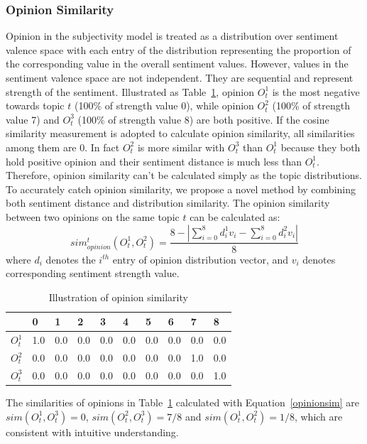 \documentclass[letterpaper]{article}
\begin{document}
\subsubsection{Opinion Similarity}
\label{opsim}

Opinion in the subjectivity model is treated  as a distribution over sentiment valence space with each entry of the distribution representing the proportion of the corresponding value in the overall sentiment values. 
However, values in the sentiment valence space are not independent. 
They are sequential and represent strength of the sentiment. Illustrated as Table~\ref{tab1}, opinion $ O_{t}^{1} $ is the most negative towards topic $ t $ (100\% of strength value 0), while opinion $ O_{t}^{2} $ (100\% of strength value 7) and $ O_{t}^{3} $ (100\% of strength value 8) are both positive.
If the cosine similarity measurement is adopted to calculate opinion similarity, all similarities among them are 0.
In fact $ O_{t}^{2} $ is more similar with $ O_{t}^{3} $ than $O_{t}^{1} $ because they both hold positive opinion and their sentiment distance is much less than $ O_{t}^{1} $.  
Therefore, opinion similarity can't be calculated simply as the topic distributions. 
To accurately catch opinion similarity, we propose a novel method by combining both sentiment distance and distribution similarity.
The opinion similarity between two opinions on the same topic $ t $ can be calculated as: 
\begin{equation}
\label{opinionsim}
sim_{opinion}^{t}(O_{t}^{1},O_{t}^{2})=\dfrac{8-|\sum_{i=0}^{8}d_{i}^{1}v_{i}-\sum_{i=0}^{8}d_{i}^{2}v_{i}|}{8}
\end{equation}
where $ d_{i} $ denotes the $ i^{th} $ entry of opinion distribution vector, and $ v_{i} $ denotes corresponding sentiment strength value. 
\begin{table}[t]
\scriptsize
\centering
\caption{Illustration of opinion similarity}
\label{tab1}
\begin{tabular}{|l|l|l|l|l|l|l|l|l|l|}
\hline
 & 0 & 1& 2 & 3 & 4 & 5 & 6 & 7 & 8 \\
\hline
$O_{t}^{1}$ & 1.0 & 0.0 & 0.0 & 0.0 & 0.0 & 0.0 & 0.0 & 0.0 & 0.0 \\
\hline
$O_{t}^{2}$ & 0.0 & 0.0 & 0.0 & 0.0 & 0.0 & 0.0 & 0.0 & 1.0 & 0.0 \\
\hline
$O_{t}^{3}$ & 0.0 & 0.0 & 0.0 & 0.0 & 0.0 & 0.0 & 0.0 & 0.0 & 1.0 \\
\hline
\end{tabular}
\end{table} 
The similarities of opinions in Table~\ref{tab1} calculated with Equation~\ref{opinionsim} are $ sim(O_{t}^{1},O_{t}^{3})=0 $, $ sim(O_{t}^{2},O_{t}^{3})=7/8 $ and $ sim(O_{t}^{1},O_{t}^{2})=1/8 $, which are consistent with intuitive understanding. 
\end{document}

